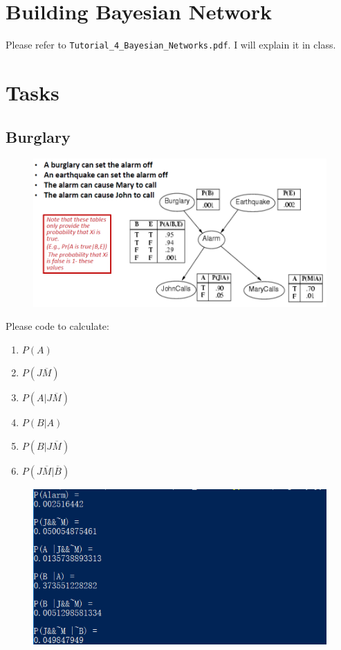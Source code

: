 \documentclass[a4paper, 11pt]{article}
\begin{document}
\section{Building Bayesian Network}
\label{sec:build-bayes-netw}
Please refer to \texttt{Tutorial\_4\_Bayesian\_Networks.pdf}. I will explain it in class.

\section{Tasks}
\label{sec:tasks}

\subsection{Burglary}
\label{sec:burglary}
\begin{figure}[h]
  \centering

  \includegraphics[width=14cm]{Pic/burglary}
\end{figure}
Please code to calculate:
\begin{enumerate}
\item $P(A)$
\item $P(J\overline{M})$
\item $P(A | J\overline{M})$
\item $P(B | A)$
  \item $P(B | J\overline{M})$
  \item  $P(J\overline{M} | \overline{B})$
\end{enumerate}
\begin{figure}[ht]
\centering
\includegraphics[width=12cm]{Pic/burglar_result}
\end{figure}
\end{document}
